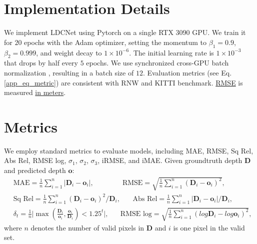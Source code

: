 \documentclass{article}
\begin{document}
\section{Implementation Details}\label{app_imd}
We implement LDCNet using Pytorch on a single RTX 3090 GPU. We train it for $20$ epochs with the Adam optimizer, setting the momentum to $\beta_{1}=0.9$, $\beta_{2}=0.999$, and weight decay to $1 \times {10}^{-6}$. The initial learning rate is $1 \times {10}^{-3}$ that drops by half every $5$ epochs. We use synchronized cross-GPU batch normalization \cite{ioffe2015batch}, resulting in a batch size of $12$. Evaluation metrics (see Eq. \ref{app_eq_metric}) are consistent with RNW \cite{wang2021regularizing} and KITTI \cite{Uhrig2017THREEDV} benchmark. \underline{RMSE} is measured \underline{in meters}. %



\section{Metrics}\label{app_metric}
We employ standard metrics to evaluate models, including MAE, RMSE, Sq Rel, Abs Rel, RMSE log, $\sigma_1$, $\sigma_2$, $\sigma_3$, iRMSE, and iMAE. Given groundtruth depth $\boldsymbol{D}$ and predicted depth $\boldsymbol{o}$: 
\footnotesize{
\begin{equation}\label{app_eq_metric}
    \begin{aligned}
        &\text{MAE}=\frac{1}{n}\sum_{i=1}^n \left| \boldsymbol D_i-\boldsymbol o_i \right|, \hspace{49pt} \text{RMSE}=\sqrt{\frac{1}{n}\sum_{i=1}^n\left( \boldsymbol D_i-\boldsymbol o_i \right)^2},\\
        &\text{Sq Rel}=\frac{1}{n}\sum_{i=1}^n\left( \boldsymbol D_i-\boldsymbol o_i \right)^2/\boldsymbol D_i, \hspace{21pt} \text{Abs Rel}=\frac{1}{n}\sum_{i=1}^n \left| \boldsymbol D_i-\boldsymbol o_i \right| /\boldsymbol D_i,\\
        &\delta_t=\frac{1}{n}\vert\max (\frac{\boldsymbol D_i}{\boldsymbol o_i},\frac{\boldsymbol o_i}{\boldsymbol D_i})<1.25^t\vert, \hspace{20pt} \text{RMSE log}=\sqrt{\frac{1}{n}\sum_{i=1}^n \left( log\boldsymbol D_i-log\boldsymbol o_i \right)^2},
    \end{aligned}
\end{equation}
}
where $n$ denotes the number of valid pixels in $\boldsymbol{D}$ and $i$ is one pixel in the valid set.  
\end{document}
